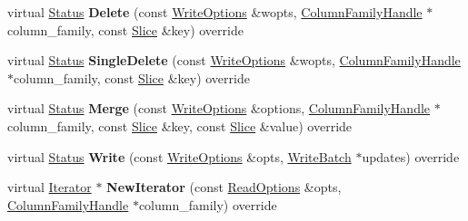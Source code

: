 \begin{DoxyCompactItemize}
\item 
virtual \hyperlink{classrocksdb_1_1Status}{Status} {\bfseries Delete} (const \hyperlink{structrocksdb_1_1WriteOptions}{Write\+Options} \&wopts, \hyperlink{classrocksdb_1_1ColumnFamilyHandle}{Column\+Family\+Handle} $\ast$column\+\_\+family, const \hyperlink{classrocksdb_1_1Slice}{Slice} \&key) override\hypertarget{classrocksdb_1_1StackableDB_add829b848d2a80da06fce732e80f4b23}{}\label{classrocksdb_1_1StackableDB_add829b848d2a80da06fce732e80f4b23}

\item 
virtual \hyperlink{classrocksdb_1_1Status}{Status} {\bfseries Single\+Delete} (const \hyperlink{structrocksdb_1_1WriteOptions}{Write\+Options} \&wopts, \hyperlink{classrocksdb_1_1ColumnFamilyHandle}{Column\+Family\+Handle} $\ast$column\+\_\+family, const \hyperlink{classrocksdb_1_1Slice}{Slice} \&key) override\hypertarget{classrocksdb_1_1StackableDB_addb7793f97dc0e00105c663b81f0c615}{}\label{classrocksdb_1_1StackableDB_addb7793f97dc0e00105c663b81f0c615}

\item 
virtual \hyperlink{classrocksdb_1_1Status}{Status} {\bfseries Merge} (const \hyperlink{structrocksdb_1_1WriteOptions}{Write\+Options} \&options, \hyperlink{classrocksdb_1_1ColumnFamilyHandle}{Column\+Family\+Handle} $\ast$column\+\_\+family, const \hyperlink{classrocksdb_1_1Slice}{Slice} \&key, const \hyperlink{classrocksdb_1_1Slice}{Slice} \&value) override\hypertarget{classrocksdb_1_1StackableDB_afdcc8a7a98f53a7de940f2fa1a0f0579}{}\label{classrocksdb_1_1StackableDB_afdcc8a7a98f53a7de940f2fa1a0f0579}

\item 
virtual \hyperlink{classrocksdb_1_1Status}{Status} {\bfseries Write} (const \hyperlink{structrocksdb_1_1WriteOptions}{Write\+Options} \&opts, \hyperlink{classrocksdb_1_1WriteBatch}{Write\+Batch} $\ast$updates) override\hypertarget{classrocksdb_1_1StackableDB_a5ab352a823028c10c232b63adfcce66c}{}\label{classrocksdb_1_1StackableDB_a5ab352a823028c10c232b63adfcce66c}

\item 
virtual \hyperlink{classrocksdb_1_1Iterator}{Iterator} $\ast$ {\bfseries New\+Iterator} (const \hyperlink{structrocksdb_1_1ReadOptions}{Read\+Options} \&opts, \hyperlink{classrocksdb_1_1ColumnFamilyHandle}{Column\+Family\+Handle} $\ast$column\+\_\+family) override\hypertarget{classrocksdb_1_1StackableDB_a66eba321df94dae343726126cb8d2af1}{}\label{classrocksdb_1_1StackableDB_a66eba321df94dae343726126cb8d2af1}


\end{DoxyCompactItemize}
